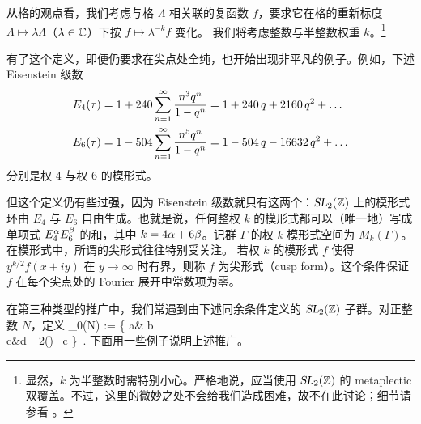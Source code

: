 从格的观点看，我们考虑与格 $\Lambda$ 相关联的复函数 $f$，要求它在格的重新标度 $\Lambda \mapsto \lambda \Lambda$（$\lambda\in\mathbb{C}$）下按 $f\mapsto \lambda^{-k}f$ 变化。
我们将考虑整数与半整数权重 $k$。\footnote{显然，$k$ 为半整数时需特别小心。严格地说，应当使用 $\operatorname{\textsl{SL}}_2(\mathbb{Z})$ 的 metaplectic 双覆盖。不过，这里的微妙之处不会给我们造成困难，故不在此讨论；细节请参看 \cite{MR1773561}。}

有了这个定义，即便仍要求在尖点处全纯，也开始出现非平凡的例子。例如，下述 Eisenstein 级数
\begin{gather}\label{def:E4E6}
\begin{split}
E_4(\tau) &= 1+240 \sum_{n=1}^\infty \frac{n^3 q^n}{1-q^n}= 1+240 \,q +2160\,q^2+\dots \\ 
E_6(\tau) &= 1-504 \sum_{n=1}^\infty \frac{n^5 q^n}{1-q^n}= 1-504 \,q -16632\,q^2+\dots
\end{split}
\end{gather}
分别是权 4 与权 6 的模形式。


但这个定义仍有些过强，因为 Eisenstein 级数就只有这两个：$\operatorname{\textsl{SL}}_2(\mathbb{Z})$ 上的模形式环由 $E_4$ 与 $E_6$ 自由生成。也就是说，任何整权 $k$ 的模形式都可以（唯一地）写成单项式 $E_4^\alpha E_6^\beta$ 的和，其中 $k=4\alpha+6\beta$。记群 $\Gamma$ 的权 $k$ 模形式空间为 $M_k(\Gamma)$。在模形式中，所谓的尖形式往往特别受关注。
若权 $k$ 的模形式 $f$ 使得 $y^{k/2} f(x+i y)$ 在 $y\to \infty$ 时有界，则称 $f$ 为尖形式（cusp form）。这个条件保证 $f$ 在每个尖点处的 Fourier 展开中常数项为零。


在第三种类型的推广中，我们常遇到由下述同余条件定义的 $\operatorname{\textsl{SL}}_2(\mathbb{Z})$ 子群。对正整数 $N$，定义
\be\label{def:cong_subgr}
\Gamma_0(N) := \left\{ \bem a& b \\ c&d \eem \in \SL_2(\ZZ) ~\mid c   \right\}~. 
\ee
下面用一些例子说明上述推广。


